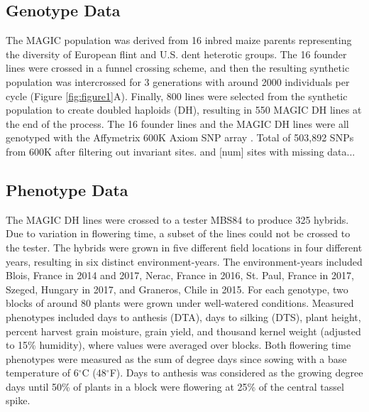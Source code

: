 \documentclass[article,9pt,twocolumn,twoside]{rilabRxiv}
\begin{document}
\subsection{Genotype Data}
The MAGIC population was derived from 16 inbred maize parents representing the
 diversity of European flint and U.S. dent heterotic groups. The 16 founder lines were crossed in a funnel crossing scheme, and then the resulting synthetic population was intercrossed for 3 generations with around 2000 individuals per cycle (Figure \ref{fig:figure1}A). Finally, 800 lines were selected from the synthetic population to create doubled haploids (DH), resulting in 550 MAGIC DH lines at the end of the process. The 16 founder lines and the MAGIC DH lines were all genotyped with the Affymetrix 600K Axiom SNP array \citep{RN13}. %
Total of 503,892 SNPs from 600K after filtering out invariant sites.  and [num] sites with missing data...

\subsection{Phenotype Data}
The MAGIC DH lines were crossed to a tester MBS84 to produce 325 hybrids. Due to variation in flowering time, a subset of the lines could not be crossed to the tester. The hybrids were grown in five different field locations in four different years, resulting in six distinct environment-years. The environment-years included Blois, France in 2014 and 2017, Nerac, France in 2016, St. Paul, France in 2017, Szeged, Hungary in 2017, and Graneros, Chile in 2015. For each genotype, two blocks of around 80 plants were grown under well-watered conditions. Measured phenotypes included days to anthesis (DTA), days to silking (DTS), plant height, percent harvest grain moisture, grain yield, and thousand kernel weight (adjusted to 15\% humidity), where values were averaged over blocks. Both flowering time phenotypes were measured as the sum of degree days since sowing with a base temperature of 6$^{\circ}$C (48$^{\circ}$F). Days to anthesis was considered as the growing degree days until 50\% of plants in a block were flowering at 25\% of the central tassel spike.
\end{document}
